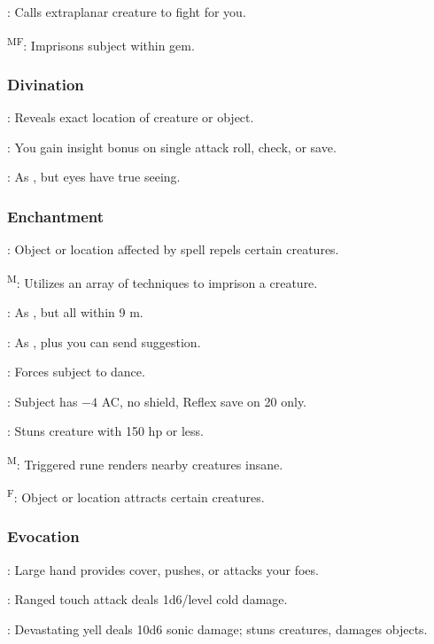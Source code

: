 	: Calls extraplanar creature to fight for you.

	\textsuperscript{MF}: Imprisons subject within gem.

\subsubsection{Divination}
	: Reveals exact location of creature or object.

	: You gain insight bonus on single attack roll, check, or save.

	: As , but eyes have true seeing.

\subsubsection{Enchantment}
	: Object or location affected by spell repels certain creatures.

	\textsuperscript{M}: Utilizes an array of techniques to imprison a creature.

	: As , but all within 9 m.

	: As , plus you can send suggestion.

	: Forces subject to dance.

	: Subject has $-4$ AC, no shield, Reflex save on 20 only.

	: Stuns creature with 150 hp or less.

	\textsuperscript{M}: Triggered rune renders nearby creatures insane.

	\textsuperscript{F}: Object or location attracts certain creatures.

\subsubsection{Evocation}
	: Large hand provides cover, pushes, or attacks your foes.

	: Ranged touch attack deals 1d6/level cold damage.

	: Devastating yell deals 10d6 sonic damage; stuns creatures, damages objects.

